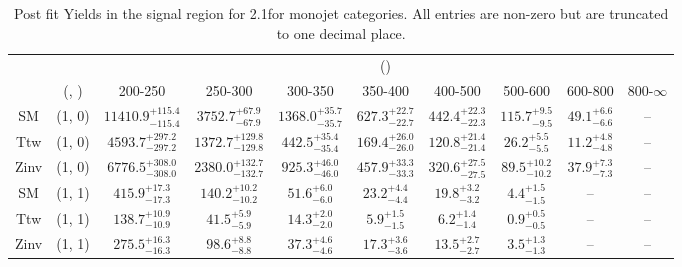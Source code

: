 \begin{table}[h!]
\tiny
\centering
\caption{Post fit Yields in the signal region for 2.1\ifb for monojet categories. All entries are non-zero but are truncated to one decimal place.\label{tab:prednodatapost_sig_comb_mono}}
\begin{tabular}
{cccccccccc}
	\hline\hline
	&	& \multicolumn{8}{c}{\scalht (\gev)}\\ 
	&	 (\njet, \nb) & 200-250 & 250-300 & 300-350 & 350-400 & 400-500 & 500-600 & 600-800 & 800-$\infty$ \\ [0.8ex] 
\hline
	SM & (1, 0) & $11410.9^{+ 115.4 }_{- 115.4 }$ & $3752.7^{+ 67.9 }_{- 67.9 }$ & $1368.0^{+ 35.7 }_{- 35.7 }$ & $627.3^{+ 22.7 }_{- 22.7 }$ & $442.4^{+ 22.3 }_{- 22.3 }$ & $115.7^{+ 9.5 }_{- 9.5 }$ & $49.1^{+ 6.6 }_{- 6.6 }$ & -- \\[0.5ex] 
	Ttw & (1, 0) & $4593.7^{+ 297.2 }_{- 297.2 }$ & $1372.7^{+ 129.8 }_{- 129.8 }$ & $442.5^{+ 35.4 }_{- 35.4 }$ & $169.4^{+ 26.0 }_{- 26.0 }$ & $120.8^{+ 21.4 }_{- 21.4 }$ & $26.2^{+ 5.5 }_{- 5.5 }$ & $11.2^{+ 4.8 }_{- 4.8 }$ & -- \\[0.5ex] 
	Zinv & (1, 0) & $6776.5^{+ 308.0 }_{- 308.0 }$ & $2380.0^{+ 132.7 }_{- 132.7 }$ & $925.3^{+ 46.0 }_{- 46.0 }$ & $457.9^{+ 33.3 }_{- 33.3 }$ & $320.6^{+ 27.5 }_{- 27.5 }$ & $89.5^{+ 10.2 }_{- 10.2 }$ & $37.9^{+ 7.3 }_{- 7.3 }$ & -- \\[0.5ex] 
	SM & (1, 1) & $415.9^{+ 17.3 }_{- 17.3 }$ & $140.2^{+ 10.2 }_{- 10.2 }$ & $51.6^{+ 6.0 }_{- 6.0 }$ & $23.2^{+ 4.4 }_{- 4.4 }$ & $19.8^{+ 3.2 }_{- 3.2 }$ & $4.4^{+ 1.5 }_{- 1.5 }$ & -- & -- \\[0.5ex] 
	Ttw & (1, 1) & $138.7^{+ 10.9 }_{- 10.9 }$ & $41.5^{+ 5.9 }_{- 5.9 }$ & $14.3^{+ 2.0 }_{- 2.0 }$ & $5.9^{+ 1.5 }_{- 1.5 }$ & $6.2^{+ 1.4 }_{- 1.4 }$ & $0.9^{+ 0.5 }_{- 0.5 }$ & -- & -- \\[0.5ex] 
	Zinv & (1, 1) & $275.5^{+ 16.3 }_{- 16.3 }$ & $98.6^{+ 8.8 }_{- 8.8 }$ & $37.3^{+ 4.6 }_{- 4.6 }$ & $17.3^{+ 3.6 }_{- 3.6 }$ & $13.5^{+ 2.7 }_{- 2.7 }$ & $3.5^{+ 1.3 }_{- 1.3 }$ & -- & -- \\[0.5ex] 
	\hline
	\hline
\end{tabular}
\end{table}
